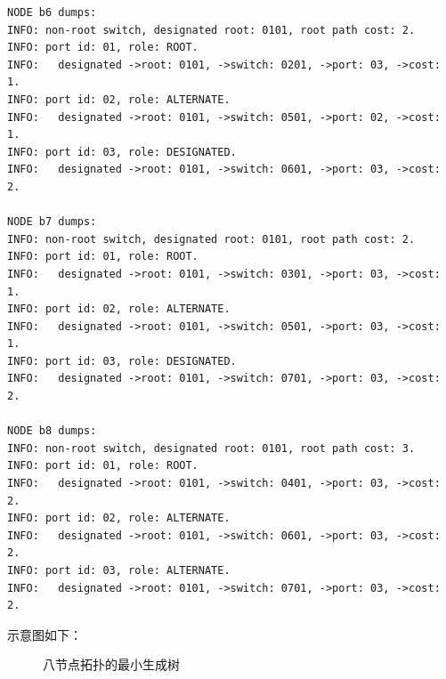 \documentclass[11pt]{article}
\begin{document}
\begin{lstlisting}
NODE b6 dumps:
INFO: non-root switch, designated root: 0101, root path cost: 2.
INFO: port id: 01, role: ROOT.
INFO: 	designated ->root: 0101, ->switch: 0201, ->port: 03, ->cost: 1.
INFO: port id: 02, role: ALTERNATE.
INFO: 	designated ->root: 0101, ->switch: 0501, ->port: 02, ->cost: 1.
INFO: port id: 03, role: DESIGNATED.
INFO: 	designated ->root: 0101, ->switch: 0601, ->port: 03, ->cost: 2.

NODE b7 dumps:
INFO: non-root switch, designated root: 0101, root path cost: 2.
INFO: port id: 01, role: ROOT.
INFO: 	designated ->root: 0101, ->switch: 0301, ->port: 03, ->cost: 1.
INFO: port id: 02, role: ALTERNATE.
INFO: 	designated ->root: 0101, ->switch: 0501, ->port: 03, ->cost: 1.
INFO: port id: 03, role: DESIGNATED.
INFO: 	designated ->root: 0101, ->switch: 0701, ->port: 03, ->cost: 2.

NODE b8 dumps:
INFO: non-root switch, designated root: 0101, root path cost: 3.
INFO: port id: 01, role: ROOT.
INFO: 	designated ->root: 0101, ->switch: 0401, ->port: 03, ->cost: 2.
INFO: port id: 02, role: ALTERNATE.
INFO: 	designated ->root: 0101, ->switch: 0601, ->port: 03, ->cost: 2.
INFO: port id: 03, role: ALTERNATE.
INFO: 	designated ->root: 0101, ->switch: 0701, ->port: 03, ->cost: 2.
\end{lstlisting}

示意图如下：
\begin{figure}[H]
\centering
{}
\caption{八节点拓扑的最小生成树}
\label{fig:my_topology_corrected}
\end{figure}
\end{document}
